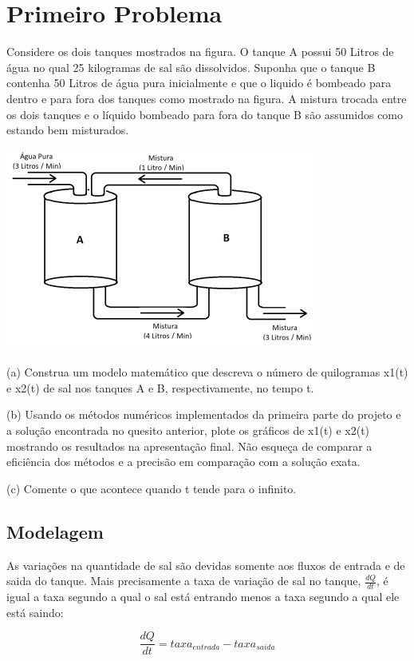 \documentclass[12pt]{article}%
\newcommand{\newpara}
    {
    \vskip 0.5cm
    }
\begin{document}
\section{Primeiro Problema}
    Considere os dois tanques mostrados na figura. O tanque A possui 50 Litros de água no qual 25
    kilogramas de sal são dissolvidos. Suponha que o tanque B contenha 50 Litros de água pura inicialmente
    e que o liquido é bombeado para dentro e para fora dos tanques como mostrado na figura. A mistura
    trocada entre os dois tanques e o líquido bombeado para fora do tanque B são assumidos como estando
    bem misturados.
    \newpara
    \begin{center}
        \includegraphics[scale=1.0]{problemas/p1.png}
    \end{center}
    
    (a) Construa um modelo matemático que descreva o número de quilogramas x1(t) e x2(t) de sal nos tanques A e B, respectivamente, no tempo t.
    \newpara
    (b) Usando os métodos numéricos implementados da primeira parte do projeto e a solução encontrada no quesito anterior, plote os gráficos de x1(t) e x2(t) mostrando os resultados na apresentação final. Não esqueça de comparar a eficiência dos métodos e a precisão em comparação com a solução exata.
    \newpara
    (c) Comente o que acontece quando t tende para o infinito.
    
    \subsection{Modelagem}
    As variações na quantidade de sal são devidas somente aos fluxos de entrada e de saida do tanque. Mais precisamente a taxa de variação de sal no tanque, \(\frac{dQ}{dt}\), é igual a taxa segundo a qual o sal está entrando menos a taxa segundo a qual ele está saindo:
    
    \begin{equation}
        \frac{dQ}{dt} = taxa_{entrada} - taxa_{saida}
    \end{equation}
    
\end{document}
